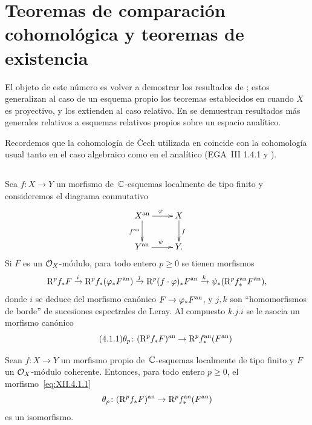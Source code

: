 
\section[Teoremas de comparación cohomológica]{Teoremas de comparación cohomológica y teoremas de existencia}
\label{XII.4}

El objeto de este número es volver a demostrar los resultados de
\cite[ th y th]{XII.3}; estos generalizan al caso de un
esquema propio los teoremas establecidos en \cite[]{XII.10} cuando
$X$ es proyectivo, y los extienden al caso relativo. En
\cite[ch\ptbl VIII ]{XII.7} se demuestran resultados más generales
relativos a esquemas relativos propios sobre un espacio analítico.

Recordemos que la cohomología de {\v{C}}ech utilizada en
\cite[]{XII.10} coincide con la cohomología usual tanto en el caso
algebraico como en el analítico (EGA~III 1.4.1 y
\cite[II 5.10]{XII.5}).
\subsection{}
\label{XII.4.1}
\setcounter{proposition}{1}%
Sea $f\colon X\to Y$ un morfismo de~$\CC$-esquemas localmente de tipo
finito y consideremos el diagrama conmutativo
$$
\xymatrix{ X^\an \ar[r]^\varphi \ar[d]_{f^\an} & X \ar[d]^f
\\ Y^\an \ar[r]^\psi & Y \quoi.}
$$
Si $F$ es un $\cal{O}_X$-módulo, para todo entero $p\geq0$ se tienen
morfismos
$$
\R^p f_* F \lto{i} \R^p f_* (\varphi_* F^\an )
\lto{j} \R^p (f\cdot\varphi)_* F^\an \lto{k} \psi_*
(\R^p f_*^\an F^\an ) \quoi,
$$
donde $i$ se deduce del morfismo canónico $F\to\varphi_*F^\an$, y $j,k$
son ``homomorfismos de borde'' de sucesiones espectrales de Leray. Al
compuesto $k.j.i$ se le asocia un morfismo canónico
\begin{equation*}
\label{eq:XII.4.1.1}
\tag{4.1.1} {\theta_p \colon (\R^p f_* F)^\an \to \R^p f_*^\an
(F^\an )}
\end{equation*}

\begin{theoreme}
\label{XII.4.2}
Sean
$f\colon X\to Y$ un morfismo propio de~$\CC$-esquemas localmente de tipo
finito y $F$ un $\cal{O}_X$-módulo coherente. Entonces, para todo entero
$p\geq0$, el morfismo~\eqref{eq:XII.4.1.1}
$$
\theta_p \colon (\R^p f_* F)^\an \to \R^p f_*^\an (F^\an)
$$
es un isomorfismo.
\end{theoreme}

